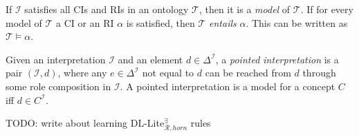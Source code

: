 If $\mathcal{I}$ satisfies all CIs and RIs in an ontology $\mathcal{T}$, then it is a \emph{model} of $\mathcal{T}$. If for every model of $\mathcal{T}$ a CI or an RI $\alpha$ is satisfied, then $\mathcal{T}$ \emph{entails} $\alpha$. This can be written as $\mathcal{T} \models \alpha$.

Given an interpretation $\mathcal{I}$ and an element $d \in \Delta^{\mathcal{I}}$, a \emph{pointed interpretation} is a pair $(\mathcal{I},d)$, where any $e\in \Delta^{\mathcal{I}}$ not equal to $d$ can be reached from $d$ through some role composition in $\mathcal{I}$. A pointed interpretation is a model for a concept $C$ iff $d\in C^{\mathcal{I}}$.

TODO: write about learning DL-Lite$_{\mathcal{R}, horn}^{\exists}$ rules



